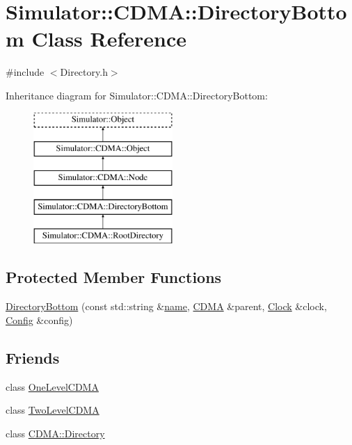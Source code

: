 \hypertarget{class_simulator_1_1_c_d_m_a_1_1_directory_bottom}{\section{Simulator\+:\+:C\+D\+M\+A\+:\+:Directory\+Bottom Class Reference}
\label{class_simulator_1_1_c_d_m_a_1_1_directory_bottom}
}


{\ttfamily \#include $<$Directory.\+h$>$}

Inheritance diagram for Simulator\+:\+:C\+D\+M\+A\+:\+:Directory\+Bottom\+:\begin{figure}[H]
\begin{center}
\leavevmode
\includegraphics[height=5.000000cm]{class_simulator_1_1_c_d_m_a_1_1_directory_bottom}
\end{center}
\end{figure}
\subsection*{Protected Member Functions}
\begin{DoxyCompactItemize}
\item 
\hyperlink{class_simulator_1_1_c_d_m_a_1_1_directory_bottom_a5390f837d78463d6907a1086a2e3fd20}{Directory\+Bottom} (const std\+::string \&\hyperlink{mtconf_8c_a8f8f80d37794cde9472343e4487ba3eb}{name}, \hyperlink{class_simulator_1_1_c_d_m_a}{C\+D\+M\+A} \&parent, \hyperlink{class_simulator_1_1_clock}{Clock} \&clock, \hyperlink{class_config}{Config} \&config)
\end{DoxyCompactItemize}
\subsection*{Friends}
\begin{DoxyCompactItemize}
\item 
class \hyperlink{class_simulator_1_1_c_d_m_a_1_1_directory_bottom_a97f5acb405692cb3363f4beb4f2dd45d}{One\+Level\+C\+D\+M\+A}
\item 
class \hyperlink{class_simulator_1_1_c_d_m_a_1_1_directory_bottom_a25bd9aa1e243b7f4e894dcc62a8a715a}{Two\+Level\+C\+D\+M\+A}
\item 
class \hyperlink{class_simulator_1_1_c_d_m_a_1_1_directory_bottom_a4af5f54393d68421df7d6c951208e049}{C\+D\+M\+A\+::\+Directory}
\end{DoxyCompactItemize}
